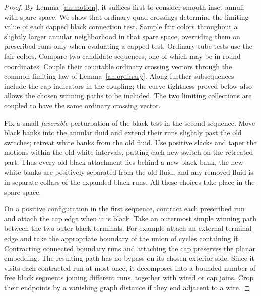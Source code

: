 \begin{proof}
By Lemma~\ref{an:motion}, it suffices first to consider smooth inset
annuli with spare space.  We show that ordinary quad crossings determine
the limiting value of each capped black connection test.  Sample fair
colors throughout a slightly larger annular neighborhood in that spare
space, overriding them on prescribed runs only when evaluating a capped
test.  Ordinary tube tests use the fair colors.  Compare two
candidate sequences, one of which may be in round coordinates.  Couple
their countable ordinary crossing vectors through the common limiting
law of Lemma~\ref{an:ordinary}.  Along further subsequences include the
cap indicators in the coupling; the curve tightness proved below also
allows the chosen winning paths to be included.  The two limiting
collections are coupled to have the same ordinary crossing vector.

Fix a small \emph{favorable} perturbation of the black test in the second
sequence.  Move black banks into the annular fluid and extend their runs
slightly past the old switches; retreat white banks from the old fluid.
Use positive slacks and taper the motions within the old white
intervals, putting each new switch on the retreated part.  Thus every old
black attachment lies behind a new black bank, the new white banks are
positively separated from the old fluid, and any removed fluid is in
separate collars of the expanded black runs.  All these choices take
place in the spare space.

On a positive configuration in the first sequence, contract each
prescribed run and attach the cap edge when it is black.  Take an
outermost simple winning path between the two outer black terminals.
For example attach an external terminal edge and take the appropriate
boundary of the union of cycles containing it.  Contracting connected
boundary runs and attaching the cap preserves the planar embedding.
The resulting path has no bypass on its chosen exterior side.  Since it
visits each contracted run at most once, it decomposes into a bounded
number of free black segments joining different runs, together with
wired or cap joins.  Crop their endpoints by a vanishing graph distance
if they end adjacent to a wire.


\end{proof}
